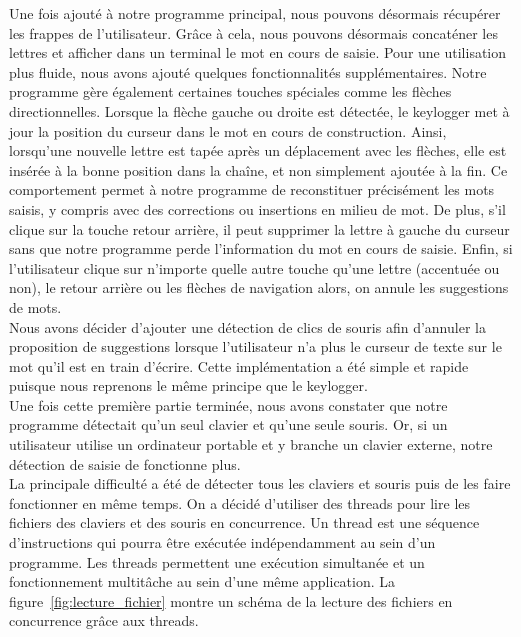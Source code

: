 \documentclass[a4paper, 11pt]{report}
\begin{document}
{Une fois ajouté à notre programme principal, nous pouvons désormais récupérer les frappes de l'utilisateur. Grâce à cela, nous pouvons désormais concaténer les lettres et afficher dans un terminal le mot en cours de saisie. Pour une utilisation plus fluide, nous avons ajouté quelques fonctionnalités supplémentaires. Notre programme gère également certaines touches spéciales comme les flèches directionnelles. Lorsque la flèche gauche ou droite est détectée, le keylogger met à jour la position du curseur dans le mot en cours de construction. Ainsi, lorsqu’une nouvelle lettre est tapée après un déplacement avec les flèches, elle est insérée à la bonne position dans la chaîne, et non simplement ajoutée à la fin. Ce comportement permet à notre programme de reconstituer précisément les mots saisis, y compris avec des corrections ou insertions en milieu de mot. De plus, s'il clique sur la touche retour arrière, il peut supprimer la lettre à gauche du curseur sans que notre programme perde l'information du mot en cours de saisie. Enfin, si l'utilisateur clique sur n'importe quelle autre touche qu'une lettre (accentuée ou non), le retour arrière ou les flèches de navigation alors, on annule les suggestions de mots. \\

Nous avons décider d'ajouter une détection de clics de souris afin d'annuler la proposition de suggestions lorsque l'utilisateur n'a plus le curseur de texte sur le mot qu'il est en train d'écrire. Cette implémentation a été simple et rapide puisque nous reprenons le même principe que le keylogger. \\

Une fois cette première partie terminée, nous avons constater que notre programme détectait qu'un seul clavier et qu'une seule souris. Or, si un utilisateur utilise un ordinateur portable et y branche un clavier externe, notre détection de saisie de fonctionne plus. \\

La principale difficulté a été de détecter tous les claviers et souris puis de les faire fonctionner en même temps. On a décidé d'utiliser des threads pour lire les fichiers des claviers et des souris en concurrence. Un thread est une séquence d'instructions qui pourra être exécutée indépendamment au sein d'un programme. Les threads permettent une exécution simultanée et un fonctionnement multitâche au sein d'une même application. La figure~\ref{fig:lecture_fichier} montre un schéma de la lecture des fichiers en concurrence grâce aux threads.

}
\end{document}
